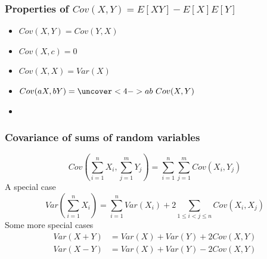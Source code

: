 \documentclass[slidestop,compress,mathserif]{beamer}
\begin{document}
\begin{frame}\frametitle{Properties of $Cov(X,Y) = E[XY]- E[X]E[Y]$}
\begin{itemize}
\item $Cov(X,Y) = Cov(Y, X)$
\pause
\item $Cov(X,c) = 0$
\pause
\item $Cov(X,X) = Var(X)$
\pause
\item $Cov(aX,bY) = \uncover<4->{ab~Cov(X,Y)}$
\pause
\uncover<4->{
\begin{align*}
Cov(aX,bY) & = E[abXY] - E[aX]E[bY] \\
	& = ab~E[XY] - ab~E[X]E[Y]
\end{align*}
}
\pause
\vspace{-0.5cm}
\item {}
\pause
\uncover<5->{
\begin{align*}
Cov(X + a,Y+b) = & E[(X+a)(Y+b)] - E[X+a]E[Y+b] \\
	= & ~E[XY + aY + bX + ab] \\
	& - (E[X] + a) (E(Y)+b)\\
	= & ~E[XY] + E[aY] + E[bX] + ab \\
	& - E[X]E[Y] - a~E[Y] -b~E[X] - ab \\
	= & ~E[XY]- E[X]E[Y]
\end{align*}
}
\end{itemize}

\end{frame}

\begin{frame}\frametitle{Covariance of sums of random variables}
\[Cov\left(\sum_{i=1}^n X_i, \sum_{j = 1}^m Y_j  \right) = \sum_{i=1}^n \sum_{j = 1}^m Cov\left(X_i, Y_j  \right)\]
\pause
A special case
\[Var\left(\sum_{i=1}^n X_i \right) = \sum_{i=1}^n Var(X_i) + 2\sum_{1 \leq i < j \leq n} Cov(X_i, X_j)\]
\pause
Some more special cases
\begin{align*}
Var(X+Y) &= Var(X)+Var(Y)+2Cov(X,Y)\\
Var(X-Y) &= Var(X)+Var(Y)-2Cov(X,Y)\\
\end{align*}


\end{frame}

\end{document}

